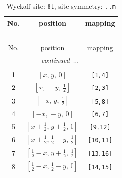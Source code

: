 \documentclass[fleqn,8pt]{jsarticle}
\begin{document}
\begin{longtable}{ccc}
\caption{Wyckoff site: {\tt 8l}, site symmetry: {\tt ..m}}
 \\
 \hline \hline
No. & position & mapping \\ \hline \endfirsthead

\multicolumn{2}{l}{\tablename\ \thetable{}} \\
 \hline \hline
No. & position & mapping \\ \hline \endhead

 \hline \hline
\multicolumn{2}{r}{\footnotesize\it continued ...} \\ \endfoot

 \hline \hline
\multicolumn{2}{r}{} \\ \endlastfoot

1 & $\left[ x,\, y,\, 0 \right]$ & {\tt [1,4]} \\ \hline
2 & $\left[ x,\, - y,\, \frac{1}{2} \right]$ & {\tt [2,3]} \\ \hline
3 & $\left[ - x,\, y,\, \frac{1}{2} \right]$ & {\tt [5,8]} \\ \hline
4 & $\left[ - x,\, - y,\, 0 \right]$ & {\tt [6,7]} \\ \hline
5 & $\left[ x + \frac{1}{2},\, y + \frac{1}{2},\, 0 \right]$ & {\tt [9,12]} \\ \hline
6 & $\left[ x + \frac{1}{2},\, \frac{1}{2} - y,\, \frac{1}{2} \right]$ & {\tt [10,11]} \\ \hline
7 & $\left[ \frac{1}{2} - x,\, y + \frac{1}{2},\, \frac{1}{2} \right]$ & {\tt [13,16]} \\ \hline
8 & $\left[ \frac{1}{2} - x,\, \frac{1}{2} - y,\, 0 \right]$ & {\tt [14,15]} \\
\end{longtable}
\renewcommand{\arraystretch}{1.2}
\end{document}

